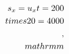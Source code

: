 \documentclass[preview]{standalone}
\begin{document}
\begin{align*}
\special{dvisvgm:raw <g id='unique000'>}s_x = u_x t = 200 \\times 20 = 4000\\,\\mathrm{m}\special{dvisvgm:raw </g>}
\end{align*}
\end{document}

